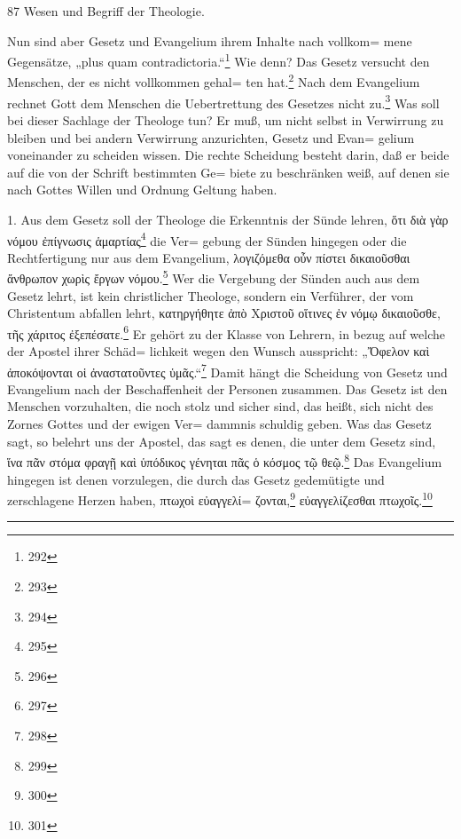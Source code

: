 \textnormal{87}
\hfill Wesen und Begriff der Theologie.

Nun sind aber Gesetz und Evangelium ihrem Inhalte nach vollkom=
mene Gegensätze, „plus quam contradictoria.“\footnote{292} Wie denn? Das Gesetz versucht den Menschen, der es nicht vollkommen gehal=
ten hat.\footnote{293} Nach dem Evangelium rechnet Gott dem Menschen die Uebertrettung des Gesetzes nicht zu.\footnote{294} Was soll bei dieser Sachlage der Theologe tun? Er muß, um nicht selbst in Verwirrung zu bleiben und bei andern Verwirrung anzurichten, Gesetz und Evan=
gelium voneinander zu scheiden wissen. Die rechte Scheidung besteht darin, daß er beide auf die von der Schrift bestimmten Ge=
biete zu beschränken weiß, auf denen sie nach Gottes Willen und Ordnung Geltung haben.

1. Aus dem Gesetz soll der Theologe die Erkenntnis der Sünde lehren, \foreignlanguage{greek}{ὅτι διὰ γὰρ νόμου ἐπίγνωσις ἁμαρτίας}\footnote{295} die Ver=
gebung der Sünden hingegen oder die Rechtfertigung nur aus dem Evangelium, \foreignlanguage{greek}{λογιζόμεθα οὖν πίστει δικαιοῦσθαι ἄνθρωπον χωρὶς ἔργων νόμου.}\footnote{296} Wer die Vergebung der Sünden auch aus dem Gesetz lehrt, ist kein christlicher Theologe, sondern ein Verführer, der vom Christentum abfallen lehrt, \foreignlanguage{greek}{κατηργήθητε ἀπὸ Χριστοῦ οἵτινες ἐν νόμῳ δικαιοῦσθε, τῆς χάριτος ἐξεπέσατε.}\footnote{297} Er gehört zu der Klasse von Lehrern, in bezug auf welche der Apostel ihrer Schäd=
lichkeit wegen den Wunsch ausspricht: \foreignlanguage{greek}{„Ὄφελον καὶ ἀποκόψονται οἱ ἀναστατοῦντες ὑμᾶς.“}\footnote{298} Damit hängt die Scheidung von Gesetz und Evangelium nach der Beschaffenheit der Personen zusammen. Das Gesetz ist den Menschen vorzuhalten, die noch stolz und sicher sind, das heißt, sich nicht des Zornes Gottes und der ewigen Ver=
dammnis schuldig geben. Was das Gesetz sagt, so belehrt uns der Apostel, das sagt es denen, die unter dem Gesetz sind, \foreignlanguage{greek}{ἵνα πᾶν στόμα φραγῇ καὶ ὑπόδικος γένηται πᾶς ὁ κόσμος τῷ θεῷ.}\footnote{299} Das Evangelium hingegen ist denen vorzulegen, die durch das Gesetz gedemütigte und zerschlagene Herzen haben, \foreignlanguage{greek}{πτωχοὶ εὐαγγελί=
ζονται,}\footnote{300} \foreignlanguage{greek}{εὐαγγελίζεσθαι πτωχοῖς.}\footnote{301}

\rule{\textwidth}{0.4pt}

